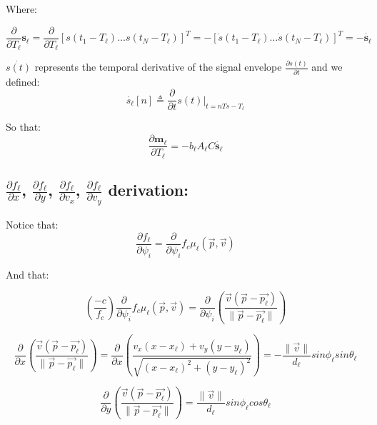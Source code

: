 \documentclass[10pt,a4paper]{report}
\begin{document}
Where:

\begin{equation}
\frac{\partial}{\partial T_\ell} \mathbf{s_\ell} = \frac{\partial}{\partial T_\ell} [s(t_1-T_\ell) \dots s(t_N-T_\ell)]^T=-[\dot{s}(t_1-T_\ell )\dots \dot{s}(t_N-T_\ell)]^T = -\mathbf{\dot{s_\ell}}
\end{equation}

$\dot{s(t)}$ represents the temporal derivative of the signal envelope $\frac{\partial s(t)}{\partial t}$ and we defined:
\begin{equation}
\dot{s_\ell}[n] \triangleq \frac{\partial}{\partial t} s(t)|_{t=nTs-T_\ell}
\end{equation}

So that:
\begin{equation}
\frac{\partial \mathbf{m_\ell}}{\partial T_\ell} = -b_\ell A_\ell C \mathbf{\dot{s_\ell}}
\end{equation}

\subsection{$\frac{\partial f_\ell}{\partial x}$, $\frac{\partial f_\ell}{\partial y}$,
$\frac{\partial f_\ell}{\partial v_x}$, $\frac{\partial f_\ell}{\partial v_y}$
 derivation:}
 Notice that:
\begin{equation}
\frac{\partial f_\ell}{\partial \psi_i} = \frac{\partial}{\partial \psi_i} f_c {\mu}_\ell (\vec{p},\vec{v})
\end{equation}

And that:

\begin{equation} 
(\frac{-c}{f_c})\frac{\partial}{\partial \psi_i} f_c \mu_\ell(\vec{p},\vec{v})=\frac{\partial}{\partial \psi_i}(\frac{\vec{v}(\vec{p}-\vec{p_\ell})}{\|\vec{p} -\vec{p_\ell}\|})                                                           
\end{equation}


\begin{equation}
\frac{\partial}{\partial x} (\frac{\vec{v}(\vec{p}-\vec{p_\ell})}{\|\vec{p}-\vec{p_\ell}\|})=\frac{\partial}{\partial x}(\frac{v_x (x-x_\ell )+v_y (y-y_\ell )}{\sqrt{(x-x_\ell )^2+(y-y_\ell )^2}})=-\frac{\|\vec{v}\|}{d_\ell}  sin \phi_\ell sin\theta_\ell
\end{equation}

\begin{equation}
\frac{\partial}{\partial y} (\frac{\vec{v}(\vec{p}-\vec{p_\ell})}{\|\vec{p}-\vec{p_\ell}\|})=\frac{\|\vec{v}\|}{d_\ell}  sin\phi_\ell cos\theta_\ell                                                           
\end{equation}
\end{document}
